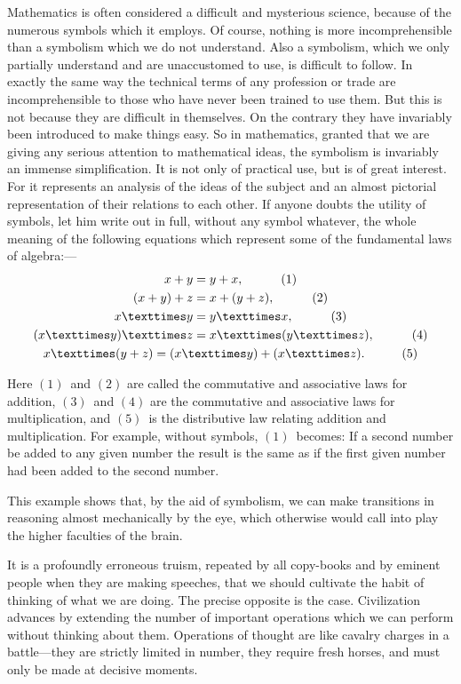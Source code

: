 \documentclass[12pt,leqno]{book}[2005/09/16]
\newcommand{\Chg}[2]{#2}
\newcommand{\Add}[1]{\Chg{}{#1}}
\newcommand{\Pagelabel}[2][page]{\phantomsection\label{#1:#2}}
\newcommand{\Pageref}[2][p.]{\hyperref[page:#2]{#1~\pageref*{page:#2}}}
\newcommand{\PageSep}[1]{\ignorespaces}
\newcommand{\Cf}{\emph{Cf.}}
\newcommand{\Tag}[1]{\tag*{\quad\ensuremath{#1}}}
\newcommand{\Eq}[1]{\ensuremath{#1}}
\begin{document}
Mathematics is often considered a difficult
and mysterious science, because of the
numerous symbols which it employs. Of
course, nothing is more incomprehensible than
\PageSep{60}
a symbolism which we do not understand.
Also a symbolism, which we only partially
understand and are unaccustomed to use, is
difficult to follow. In exactly the same way
the technical terms of any profession or trade
are incomprehensible to those who have never
been trained to use them. But this is not
because they are difficult in themselves. On
the contrary they have invariably been introduced
to make things easy. So in mathematics,
granted that we are giving any serious
attention to mathematical ideas, the symbolism
is invariably an immense simplification.
It is not only of practical use, but is
of great interest. For it represents an analysis
of the ideas of the subject and an almost
pictorial representation of their relations to
each other. If anyone doubts the utility of
symbols, let him write out in full, without any
symbol whatever, the whole meaning of the
following equations which represent some of
%
the fundamental laws of algebra\footnotemark:---
\footnotetext{\Chg{Cf.}{\Cf}\ Note~A, \Pageref{noteA}.\Pagelabel{60}}
\begin{gather*}
x + y = y + x\Add{,}
\Tag{(1)} \\
(x + y) + z = x + (y + z)\Add{,}
\Tag{(2)} \\
x × y = y × x\Add{,}
\Tag{(3)} \\
(x × y) × z = x × (y × z)\Add{,}
\Tag{(4)} \\
x × (y + z) = (x × y) + (x × z)\Add{.}
\Tag{(5)}
\end{gather*}

Here \Eq{(1)}~and \Eq{(2)} are called the commutative
and associative laws for addition, \Eq{(3)}~and \Eq{(4)}
\PageSep{61}
are the commutative and associative laws for
multiplication, and \Eq{(5)}~is the distributive law
relating addition and multiplication. For example,
without symbols, \Eq{(1)}~becomes: If a
second number be added to any given number
the result is the same as if the first given
number had been added to the second number.

This example shows that, by the aid of symbolism,
we can make transitions in reasoning
almost mechanically by the eye, which otherwise
would call into play the higher faculties
of the brain.

It is a profoundly erroneous truism, repeated
by all copy-books and by eminent people when
they are making speeches, that we should
cultivate the habit of thinking of what we are
doing. The precise opposite is the case.
Civilization advances by extending the number
of important operations which we can
perform without thinking about them. Operations
of thought are like cavalry charges in
a battle---they are strictly limited in number,
they require fresh horses, and must only
be made at decisive moments.
\end{document}
